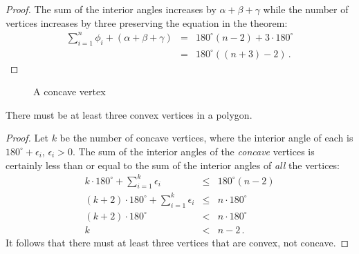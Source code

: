 \begin{proof}
\newpage

The sum of the interior angles increases by $\alpha+\beta+\gamma$ while the number of vertices increases by three preserving the equation in the theorem:
\begin{eqnarray*}
\displaystyle\sum_{i=1}^n \phi_i + (\alpha + \beta + \gamma) &=& 180^\circ(n-2)+3\cdot 180^\circ\\
&=& 180^\circ((n+3)-2)\,.
\end{eqnarray*}
\end{proof}

\begin{figure}[t]
\begin{center}
\end{center}
\caption{A concave vertex}\label{f.museum.concave}
\end{figure}


\begin{theorem}\label{thm.convex}
There must be at least three convex vertices in a polygon.
\end{theorem}

\begin{proof} Let $k$ be the number of concave vertices, where the interior angle of each is $180^\circ+\epsilon_i$, $\epsilon_i>0$. The sum of the interior angles of the \emph{concave} vertices is certainly less than or equal to the sum of the interior angles of \emph{all} the vertices:
%
\begin{eqnarray*}
k\cdot 180^\circ +\displaystyle\sum_{i=1}^{k}\epsilon_i &\leq& 180^\circ(n-2)\\
(k+2)\cdot 180^\circ +\displaystyle\sum_{i=1}^{k}\epsilon_i &\leq& n\cdot 180^\circ\\
(k+2)\cdot 180^\circ &<& n\cdot 180^\circ\\
k&<&n-2\,.
\end{eqnarray*}
It follows that there must at least three vertices that are convex, not concave.
\end{proof}

